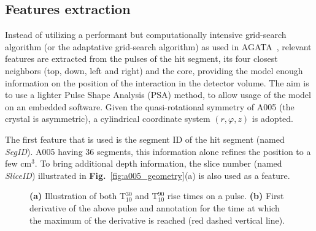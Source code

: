 \subsection{Features extraction}
\label{subsec:feature_extraction}

Instead of utilizing a performant but computationally intensive grid-search algorithm (or the adaptative grid-search algorithm) as used in AGATA~\cite{Venturelli2004}, relevant features are extracted from the pulses of the hit segment, its four closest neighbors (top, down, left and right) and the core, providing the model enough information on the position of the interaction in the detector volume. The aim is to use a lighter Pulse Shape Analysis (PSA) method, to allow usage of the model on an embedded software. Given the quasi-rotational symmetry of A005 (the crystal is asymmetric), a cylindrical coordinate system $(r, \varphi, z)$ is adopted.

The first feature that is used is the segment ID of the hit segment (named \textit{SegID}). A005 having 36 segments, this information alone refines the position to a few cm$^3$. To bring additional depth information, the slice number (named \textit{SliceID}) illustrated in \textbf{Fig.}~\ref{fig:a005_geometry}(a) is also used as a feature.

\begin{figure}
\centering
{}
\caption{\textbf{(a)} Illustration of both T$^{30}_{10}$ and T$^{90}_{10}$ rise times on a pulse. \textbf{(b)} First derivative of the above pulse and annotation for the time at which the maximum of the derivative is reached (red dashed vertical line).}
\label{fig:pulse_t30_t90}
\end{figure}

